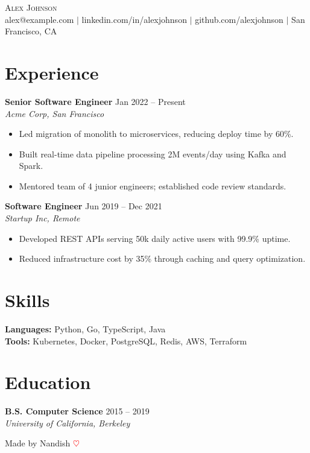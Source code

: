 \documentclass[letterpaper,11pt]{article}
\newcommand{\cvitem}[1]{\item\small{#1\vspace{-2pt}}}
\begin{document}
\begin{center}
  {\Huge\scshape Alex Johnson}\\[4pt]
  \small
  alex@example.com $|$
  linkedin.com/in/alexjohnson $|$
  github.com/alexjohnson $|$
  San Francisco, CA
\end{center}

\section{Experience}
\textbf{Senior Software Engineer} \hfill Jan 2022 -- Present\\
\textit{Acme Corp, San Francisco}
\begin{itemize}[leftmargin=0.2in, noitemsep]
  \cvitem{Led migration of monolith to microservices, reducing deploy time by 60\%.}
  \cvitem{Built real-time data pipeline processing 2M events/day using Kafka and Spark.}
  \cvitem{Mentored team of 4 junior engineers; established code review standards.}
\end{itemize}

\textbf{Software Engineer} \hfill Jun 2019 -- Dec 2021\\
\textit{Startup Inc, Remote}
\begin{itemize}[leftmargin=0.2in, noitemsep]
  \cvitem{Developed REST APIs serving 50k daily active users with 99.9\% uptime.}
  \cvitem{Reduced infrastructure cost by 35\% through caching and query optimization.}
\end{itemize}

\section{Skills}
\textbf{Languages:} Python, Go, TypeScript, Java\\
\textbf{Tools:} Kubernetes, Docker, PostgreSQL, Redis, AWS, Terraform

\section{Education}
\textbf{B.S. Computer Science} \hfill 2015 -- 2019\\
\textit{University of California, Berkeley}

\vfill
\begin{center}
  \small Made by Nandish \textcolor{red}{$\heartsuit$}
\end{center}
\end{document}
